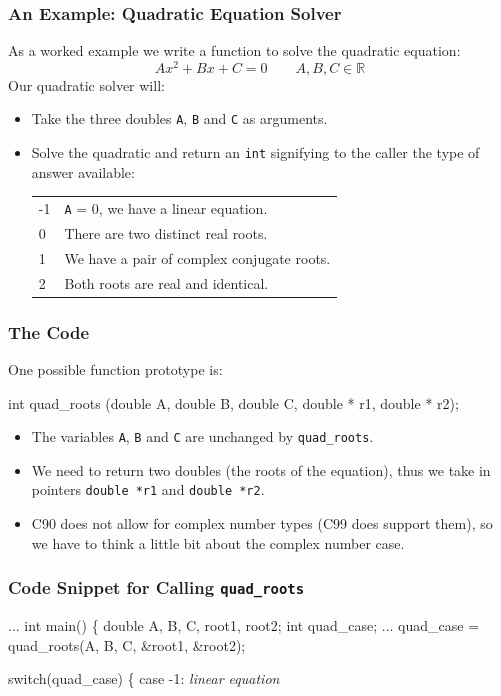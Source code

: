 \documentclass[table]{beamer}
\newif\ifschigh\schighfalse
\newcommand{\kw}[1]{\ifschigh\textcolor{red}{#1}\else\textcolor{keyword}{#1}\fi}
\begin{document}
\begin{frame}
\frametitle{An Example: Quadratic Equation Solver}
As a worked example we write a function to solve the quadratic equation:
$$ A x^2 + B x + C=0 \qquad A,B,C\in\mathbb{R}$$
Our quadratic solver will:
\begin{itemize}
\item Take the three doubles {\tt A}, {\tt B} and {\tt C} as arguments.
\item Solve the quadratic and return an \kw{\tt int} signifying to the caller the type of answer available:
\begin{tabular}{l l}
-1&{\tt A} = 0, we have a linear equation.\\
0&There are two distinct real roots.\\
1&We have a pair of complex conjugate roots.\\
2&Both roots are real and identical.
\end{tabular}
\end{itemize}
\end{frame}

\begin{frame}[fragile]
\frametitle{The Code}
One possible function prototype is:
\begin{semiverbatim}
\kw{int} quad_roots (\kw{double} A, \kw{double} B, \kw{double} C,
                \kw{double} * r1, \kw{double} * r2);
\end{semiverbatim}
\begin{itemize}
\item The variables {\tt A}, {\tt B} and {\tt C} are unchanged by {\tt quad\_roots}.
\item We need to return two doubles (the roots of the equation), thus we take in pointers {\tt \kw{double} *r1} and {\tt \kw{double} *r2}.
\item C90 does not allow for complex number types (C99 does support them), so we have to think a little bit about the complex number case.
\end{itemize}
\end{frame}

\begin{frame}[fragile]
\frametitle{Code Snippet for Calling {\tt quad\_roots}}
\begin{semiverbatim}
...
\kw{int} main()
\{
   \kw{double} A, B, C, root1, root2;
   \kw{int} quad_case;   
   ...   
   quad_case = quad_roots(A, B, C, &root1,
                          &root2);
                          
   \kw{switch}(quad_case)
   \{
   \kw{case} -1: \emph{linear equation}
\end{semiverbatim}
\end{frame}
\end{document}
